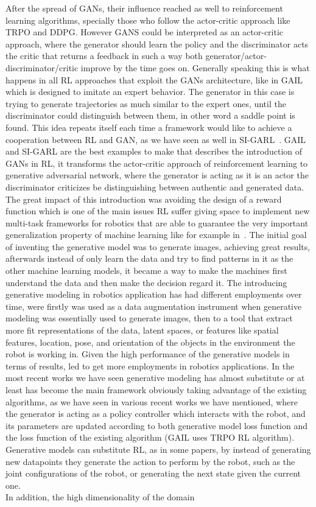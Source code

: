 After the spread of GANs, their influence reached as well to reinforcement learning algorithms, specially those who follow the actor-critic approach like TRPO and DDPG. However GANS could be interpreted as an actor-critic approach, where the generator should learn the policy and the discriminator acts the critic that returns a feedback in such a way both generator/actor-discriminator/critic improve by the time goes on. Generally speaking this is what happens in all RL approaches that exploit the GANs architecture, like in GAIL~\cite{DBLP:journals/corr/HoE16} which is designed to imitate an expert behavior. The generator in this case is trying to generate trajectories as much similar to the expert ones, until the discriminator could distinguish between them, in other word a saddle point is found. This idea repeats itself each time a framework would like to achieve a cooperation between RL and GAN, as we have seen as well in SI-GARL~\cite{liu2019self}. GAIL and SI-GARL are the best examples to make that describes the introduction of GANs in RL, it transforms the actor-critic approach of reinforcement learning to generative adversarial network, where the generator is acting as it is an actor the discriminator criticizes be distinguishing between authentic and generated data. The great impact of this introduction was avoiding the design of a reward function which is one of the main issues RL suffer giving space to implement new multi-task frameworks for robotics that are able to guarantee the very important generalization property of machine learning like for example in~\cite{rahmatizadeh2018vision}. The initial goal of inventing the generative model was to generate images, achieving great results, afterwards instead of only learn the data and try to find patterns in it as the other machine learning models, it became a way to make the machines first understand the data and then make the decision regard it. The introducing generative modeling in robotics application has had different employments over time, were firstly was used as a data augmentation instrument when generative modeling was essentially used to generate images, then to a tool that extract more fit representations of the data, latent spaces, or features like spatial features, location, pose, and orientation of the objects in the environment the robot is working in. Given the high performance of the generative models in terms of results, led to get more employments in robotics applications. In the most recent works we have seen generative modeling has almost substitute or at least has become the main framework obviously taking advantage of the existing algorithms, as we have seen in various recent works we have mentioned, where the generator is acting as a policy controller which interacts with the robot, and its parameters are updated according to both generative model loss function and the loss function of the existing algorithm (GAIL uses TRPO RL algorithm). Generative models can substitute RL, as in some papers, by instead of generating new datapoints they generate the action to perform by the robot, such as the joint configurations of the robot, or generating the next state given the current one.\\ In addition, the high dimensionality of the domain 